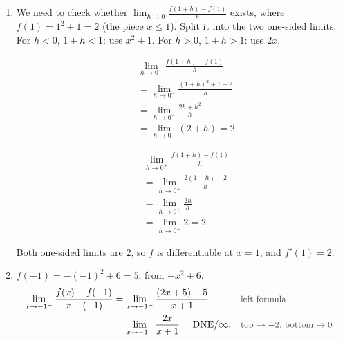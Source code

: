 \documentclass[11pt,a4paper]{article}
\newcounter{example}
\newcommand{\DNEinf}{\ensuremath{\text{DNE}/\infty}}
\newcommand{\DNEninf}{\ensuremath{\text{DNE}/{-\infty}}}
\newcommand{\why}[1]{\text{\small\color{darkgray}#1}}
\newcommand{\twosides}[2]{\par\smallskip\noindent\begin{minipage}[t]{0.47\linewidth}#1\end{minipage}\hfill{\color{rulegray}\vrule width 0.6pt}\hfill\begin{minipage}[t]{0.47\linewidth}#2\end{minipage}\par\smallskip}
\begin{document}
\begin{examplesolution}
\begin{enumerate}[label=(\alph*)]
 Differentiability: we need to check whether $\displaystyle\lim_{h\to0}\frac{g(1+h)-g(1)}{h}$ exists. Split it into the two one-sided limits.
 \twosides{%
 \begin{align*}
 &\lim_{h\to0^-}\frac{g(1+h)-g(1)}{h}\\
 &=\lim_{h\to0^-}\frac{1+\sqrt{|h|}-1}{h}=\lim_{h\to0^-}\frac{\sqrt{-h}}{h}\\
 &=\lim_{h\to0^-}\frac{\sqrt{-h}}{-\bigl(\sqrt{-h}\bigr)^2}=\lim_{h\to0^-}\frac{-1}{\sqrt{-h}}\\
 &=\DNEninf
 \end{align*}}{%
 \begin{align*}
 &\lim_{h\to0^+}\frac{g(1+h)-g(1)}{h}\\
 &=\lim_{h\to0^+}\frac{1+\sqrt{|h|}-1}{h}=\lim_{h\to0^+}\frac{\sqrt h}{h}\\
 &=\lim_{h\to0^+}\frac{\sqrt h}{\bigl(\sqrt h\bigr)^2}=\lim_{h\to0^+}\frac{1}{\sqrt h}\\
 &=\DNEinf
 \end{align*}}
 The one-sided limits are not finite, so $g'(1)$ does not exist: $g$ is continuous but not differentiable at $x=1$ (a cusp).
 \item We need to check whether $\displaystyle\lim_{h\to0}\frac{f(1+h)-f(1)}{h}$ exists, where $f(1)=1^2+1=2$ (the piece $x\le1$). Split it into the two one-sided limits. For $h<0$, $1+h<1$: use $x^2+1$. For $h>0$, $1+h>1$: use $2x$.
 \twosides{%
 \begin{align*}
 &\lim_{h\to0^-}\frac{f(1+h)-f(1)}{h}\\
 &=\lim_{h\to0^-}\frac{(1+h)^2+1-2}{h}\\
 &=\lim_{h\to0^-}\frac{2h+h^2}{h}\\
 &=\lim_{h\to0^-}(2+h)=2
 \end{align*}}{%
 \begin{align*}
 &\lim_{h\to0^+}\frac{f(1+h)-f(1)}{h}\\
 &=\lim_{h\to0^+}\frac{2(1+h)-2}{h}\\
 &=\lim_{h\to0^+}\frac{2h}{h}\\
 &=\lim_{h\to0^+}2=2
 \end{align*}}
 Both one-sided limits are $2$, so $f$ is differentiable at $x=1$, and $f'(1)=2$.
 \item $f(-1)=-(-1)^2+6=5$, from $-x^2+6$.
 \begin{align*}
 \lim_{x\to-1^-}\frac{f(x)-f(-1)}{x-(-1)}&=\lim_{x\to-1^-}\frac{(2x+5)-5}{x+1} &&\why{left formula}\\
 &=\lim_{x\to-1^-}\frac{2x}{x+1}=\DNEinf, &&\why{top $\to-2$, bottom $\to0^-$}\\

\end{align*}
\end{enumerate}
\end{examplesolution}
\end{document}
